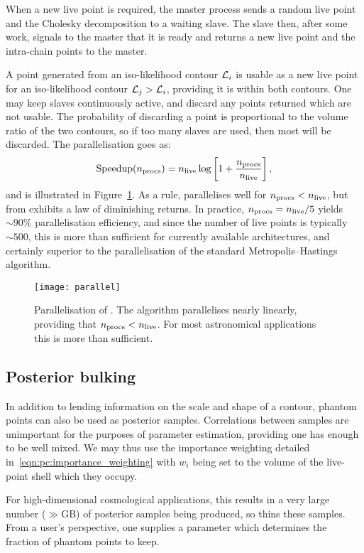 When a new live point is required, the master process sends a random live point and the Cholesky decomposition to a waiting slave.  The slave then, after some work, signals to the master that it is ready and returns a new live point and the intra-chain points to the master.

A point generated from an iso-likelihood contour $\mathcal{L}_i$ is usable as a new live point for an iso-likelihood contour $\mathcal{L}_j>\mathcal{L}_i$, providing it is within both contours.  One may keep slaves continuously active, and discard any points returned which are not usable.  The probability of discarding a point is proportional to the volume ratio of the two contours, so if too many slaves are used, then most will be discarded.  The parallelisation goes as:
\begin{equation}
  \text{Speedup}(n_{\mathrm{procs}}) = n_{\mathrm{live}}\log\left[ 1 + \frac{n_{\mathrm{procs}}}{n_{\mathrm{live}}} \right],
  \label{eqn:pc:parallel}
\end{equation}
and is illustrated in Figure~\ref{fig:pc:parallel}. 
As a rule, \PolyChord{} parallelises well for $n_{\mathrm{procs}}<n_{\mathrm{live}}$, but from exhibits a law of diminishing returns. In practice, $n_{\mathrm{procs}} = n_{\mathrm{live}}/5$ yields $\sim90\%$ parallelisation efficiency, and
since the number of live points is typically $\sim500$, this is more than sufficient for currently available \openMPI{} architectures, and certainly superior to the parallelisation of the standard Metropolis--Hastings algorithm.
%
\begin{figure}
  \centering
  \texttt{[image: parallel]}
  \caption{%
Parallelisation of \PolyChord{}. 
The algorithm parallelises nearly linearly, providing that $n_{\mathrm{procs}}<n_{\mathrm{live}}$. For most astronomical applications this is more than sufficient.\label{fig:pc:parallel}}
\end{figure}
%
\subsection{Posterior bulking}
\label{sec:pc:posterior_bulking}
In addition to lending information on the scale and shape of a contour, phantom points can also be used as posterior samples. Correlations between samples are unimportant for the purposes of parameter estimation, providing one has enough to be well mixed. We may thus use the importance weighting detailed in~\eqref{eqn:pc:importance_weighting} with $w_i$ being set to the volume of the live-point shell which they occupy.

For high-dimensional cosmological applications, this results in a very large number ($\gg$GB) of posterior samples being produced, so \PolyChord{} thins these samples. From a user's perspective, one supplies a parameter which determines the fraction of phantom points to keep.


